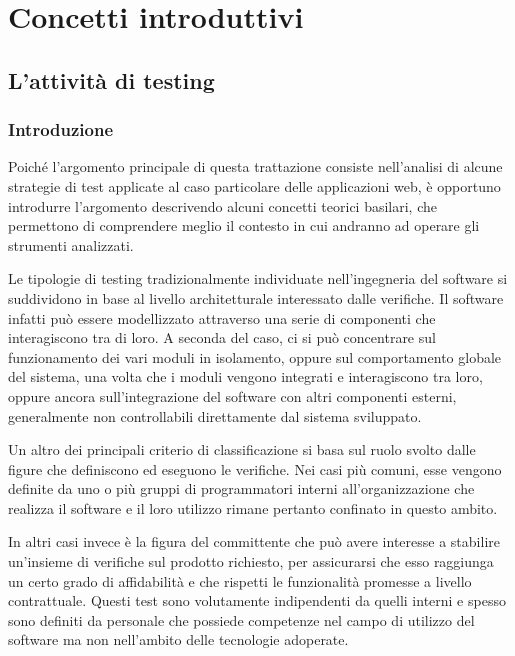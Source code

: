 \chapter{Concetti introduttivi}

\section{L'attività di testing}

\subsection{Introduzione}

Poiché l'argomento principale di questa trattazione consiste nell'analisi di alcune strategie di test applicate al caso particolare delle applicazioni web, è opportuno introdurre l'argomento descrivendo alcuni concetti teorici basilari, che permettono di comprendere meglio il contesto in cui andranno ad operare gli strumenti analizzati.

Le tipologie di testing tradizionalmente individuate nell'ingegneria del software si suddividono in base al livello architetturale interessato dalle verifiche.
Il software infatti può essere modellizzato attraverso una serie di componenti che interagiscono tra di loro. A seconda del caso, ci si può concentrare sul funzionamento dei vari moduli in isolamento, oppure sul comportamento globale del sistema, una volta che i moduli vengono integrati e interagiscono tra loro, oppure ancora sull'integrazione del software con altri componenti esterni, generalmente non controllabili direttamente dal sistema sviluppato.

Un altro dei principali criterio di classificazione si basa sul ruolo svolto dalle figure che definiscono ed eseguono le verifiche. Nei casi più comuni, esse vengono definite da uno o più gruppi di programmatori interni all'organizzazione che realizza il software e il loro utilizzo rimane pertanto confinato in questo ambito.

In altri casi invece è la figura del committente che può avere interesse a stabilire un'insieme di verifiche sul prodotto richiesto, per assicurarsi che esso raggiunga un certo grado di affidabilità e che rispetti le funzionalità promesse a livello contrattuale. Questi test sono volutamente indipendenti da quelli interni e spesso sono definiti da personale che possiede competenze nel campo di utilizzo del software ma non nell'ambito delle tecnologie adoperate. 

